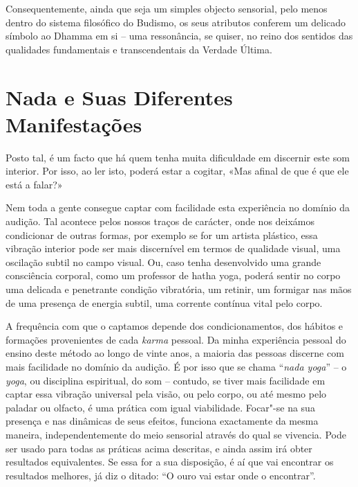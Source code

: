 Consequentemente, ainda que seja um simples objecto sensorial, pelo
menos dentro do sistema filosófico do Budismo, os seus atributos
conferem um delicado símbolo ao Dhamma em si -- uma ressonância, se
quiser, no reino dos sentidos das qualidades fundamentais e
transcendentais da Verdade Última.

\section{Nada e Suas Diferentes Manifestações}

Posto tal, é um facto que há quem tenha muita dificuldade em discernir
este som interior. Por isso, ao ler isto, poderá estar a cogitar, «Mas
afinal de que é que ele está a falar?»

Nem toda a gente consegue captar com facilidade esta experiência no
domínio da audição. Tal acontece pelos nossos traços de carácter, onde
nos deixámos condicionar de outras formas, por exemplo se for um artista
plástico, essa vibração interior pode ser mais discernível em termos de
qualidade visual, uma oscilação subtil no campo visual. Ou, caso tenha
desenvolvido uma grande consciência corporal, como um professor de hatha
yoga, poderá sentir no corpo uma delicada e penetrante condição
vibratória, um retinir, um formigar nas mãos de uma presença de energia
subtil, uma corrente contínua vital pelo corpo.

A frequência com que o captamos depende dos condicionamentos, dos
hábitos e formações provenientes de cada \emph{karma} pessoal. Da minha
experiência pessoal do ensino deste método ao longo de vinte anos, a
maioria das pessoas discerne com mais facilidade no domínio da audição.
É por isso que se chama ``\emph{nada yoga}'' -- o \emph{yoga}, ou
disciplina espiritual, do som -- contudo, se tiver mais facilidade em
captar essa vibração universal pela visão, ou pelo corpo, ou até mesmo
pelo paladar ou olfacto, é uma prática com igual viabilidade. Focar"-se
na sua presença e nas dinâmicas de seus efeitos, funciona exactamente da
mesma maneira, independentemente do meio sensorial através do qual se
vivencia. Pode ser usado para todas as práticas acima descritas, e ainda
assim irá obter resultados equivalentes. Se essa for a sua disposição, é
aí que vai encontrar os resultados melhores, já diz o ditado: ``O ouro
vai estar onde o encontrar''.
